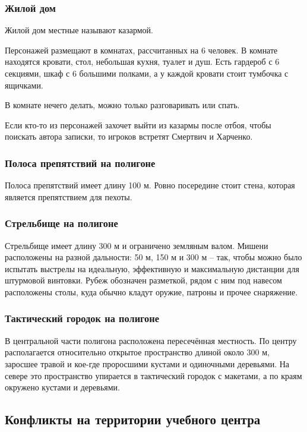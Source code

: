 \documentclass{article}
\begin{document}
\subsubsection{Жилой
дом}\label{barracks}

Жилой дом местные называют казармой.

Персонажей размещают в комнатах, рассчитанных на 6 человек. В комнате
находятся кровати, стол, небольшая кухня, туалет и душ. Есть гардероб с
6 секциями, шкаф с 6 большими полками, а у каждой кровати стоит тумбочка
с ящичками.

В комнате нечего делать, можно только разговаривать или спать.

Если кто-то из персонажей захочет выйти из казармы после отбоя, чтобы
поискать автора записки, то игроков встретят Смертвич и Харченко.

\subsubsection{Полоса препятствий на
полигоне}\label{obstacle-course}

Полоса препятствий имеет длину 100 м. Ровно посередине стоит стена,
которая является препятствием для пехоты.

\subsubsection{Стрельбище на
полигоне}\label{firing-range}

Стрельбище имеет длину 300 м и ограничено земляным валом. Мишени
расположены на разной дальности: 50 м, 150 м и 300 м -- так, чтобы можно
было испытать выстрелы на идеальную, эффективную и максимальную
дистанции для штурмовой винтовки. Рубеж обозначен разметкой, рядом с ним
под навесом расположены столы, куда обычно кладут оружие, патроны и
прочее снаряжение.

\subsubsection{Тактический городок на
полигоне}\label{tactical-village}

В центральной части полигона расположена пересечённая местность. По
центру располагается относительно открытое пространство длиной около 300
м, заросшее травой и кое-где проросшими кустами и одиночными деревьями.
На севере это пространство упирается в тактический городок с макетами, а
по краям окружено кустами и деревьями.

\subsection{Конфликты на территории учебного
центра}\label{training-conflicts}
\end{document}
